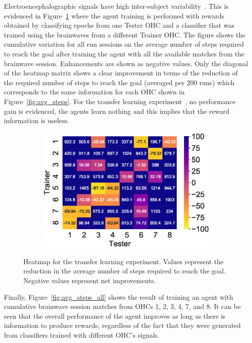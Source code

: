 \documentclass[journal]{IEEEtran}
\begin{document}
{{Electroencephalographic signals have high inter-subject variability~\cite{Chavarriaga2014}.  This is evidenced in Figure~\ref{fig:transferlearning} where the agent training is performed with rewards obtained by classifying epochs from one Tester OHC and a classifier that was trained using the brainwaves from a different Trainer OHC.  The figure shows the cumulative variation for all run sessions on the average number of steps required to reach the goal after training the agent with all the available matches from the brainwave session.  Enhancements are shown as negative values.  Only the diagonal of the heatmap matrix shows a clear improvement in terms of the reduction of the required number of steps to reach the goal (averaged per 200 runs) which corresponds to the same information for each OHC shown in Figure~\ref{fig:avg_steps}.  For the transfer learning experiment~\cite{Wu2016}, no performance gain is evidenced, the agents learn nothing and this implies that the reward information is useless.


\begin{figure}[h!]
\begin{subfigure}{0.5\textwidth}
\includegraphics[scale=0.60]{revisedimages/transfer_learning_heatmap.eps}
\end{subfigure}
\caption{Heatmap for the transfer learning experiment. Values represent the reduction in the average number of steps required to reach the goal.  Negative values represent net improvements.}
\label{fig:transferlearning}
\end{figure}

Finally, Figure~\ref{fig:avg_steps_all} shows the result of training an agent with cumulative brainwave session matches from OHCs 1, 2, 3, 4, 7, and 8.  It can be seen that the overall performance of the agent improves as long as there is information to produce rewards, regardless of the fact that they were generated from classifiers trained with different OHC's signals.


}}
\end{document}
